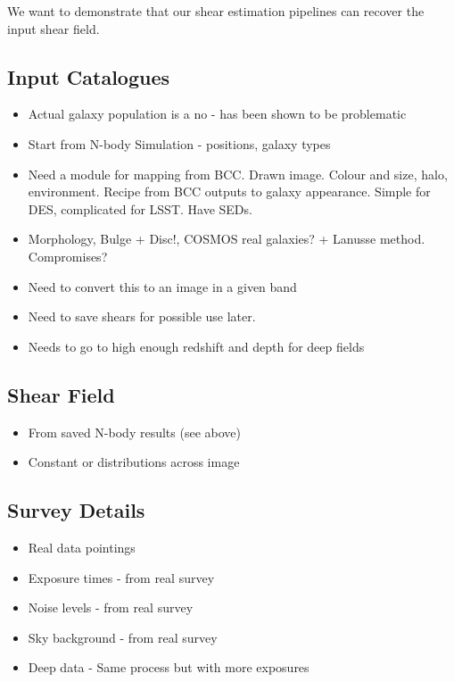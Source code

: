 \documentclass[\docopts]{\docclass}
\begin{document}
We want to demonstrate that our shear estimation pipelines can recover the input shear field.

\subsection{Input Catalogues}

\begin{itemize}
\item Actual galaxy population is a no - has been shown to be problematic
\item Start from N-body Simulation - positions, galaxy types
\item Need a module for mapping from BCC.  Drawn image.  Colour and size, halo, environment.
	Recipe from BCC outputs to galaxy appearance.
	Simple for DES, complicated for LSST.
	Have SEDs.
\item Morphology, Bulge + Disc!, COSMOS real galaxies? + Lanusse method. Compromises?
\item Need to convert this to an image in a given band
\item Need to save shears for possible use later.
\item Needs to go to high enough redshift and depth for deep fields
\end{itemize}

\subsection{Shear Field}

\begin{itemize}
\item From saved N-body results (see above)
\item Constant or distributions across image
\end{itemize}

\subsection{Survey Details}

\begin{itemize}
\item Real data pointings
\item Exposure times - from real survey
\item Noise levels - from real survey
\item Sky background - from real survey
\item Deep data - Same process but with more exposures
\end{itemize}
\end{document}
